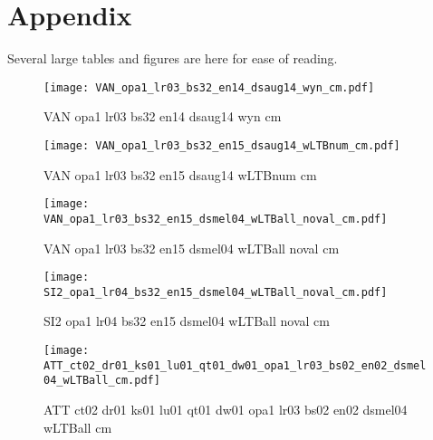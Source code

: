 \section{Appendix}
\label{sec:appendix}

\renewcommand{\thefigure}{A.\arabic{figure}}
\setcounter{figure}{0}

\renewcommand{\thetable}{A.\arabic{table}}
\setcounter{table}{0}

Several large tables and figures are here for ease of reading.

\begin{figure}[t!]
    \centering
    \texttt{[image: VAN\_opa1\_lr03\_bs32\_en14\_dsaug14\_wyn\_cm.pdf]}
    \caption{VAN opa1 lr03 bs32 en14 dsaug14 wyn cm}%
    \label{fig:VAN_opa1_lr03_bs32_en14_dsaug14_wyn_cm}
\end{figure}

\begin{figure}[t!]
    \centering
    \texttt{[image: VAN\_opa1\_lr03\_bs32\_en15\_dsaug14\_wLTBnum\_cm.pdf]}
    \caption{VAN opa1 lr03 bs32 en15 dsaug14 wLTBnum cm}%
    \label{fig:VAN_opa1_lr03_bs32_en15_dsaug14_wLTBnum_cm}
\end{figure}

\begin{figure*}[t!]
    \centering
    \texttt{[image: VAN\_opa1\_lr03\_bs32\_en15\_dsmel04\_wLTBall\_noval\_cm.pdf]}
    \caption{VAN opa1 lr03 bs32 en15 dsmel04 wLTBall noval cm}%
    \label{fig:VAN_opa1_lr03_bs32_en15_dsmel04_wLTBall_noval_cm}
\end{figure*}

\begin{figure*}[t!]
    \centering
    \texttt{[image: SI2\_opa1\_lr04\_bs32\_en15\_dsmel04\_wLTBall\_noval\_cm.pdf]}
    \caption{SI2 opa1 lr04 bs32 en15 dsmel04 wLTBall noval cm}%
    \label{fig:SI2_opa1_lr04_bs32_en15_dsmel04_wLTBall_noval_cm}
\end{figure*}

\begin{figure*}[t!]
    \centering
    \texttt{[image: ATT\_ct02\_dr01\_ks01\_lu01\_qt01\_dw01\_opa1\_lr03\_bs02\_en02\_dsmel04\_wLTBall\_cm.pdf]}
    \caption{ATT ct02 dr01 ks01 lu01 qt01 dw01 opa1 lr03 bs02 en02 dsmel04 wLTBall cm}%
    \label{fig:ATT_ct02_dr01_ks01_lu01_qt01_dw01_opa1_lr03_bs02_en02_dsmel04_wLTBall_cm}
\end{figure*}


